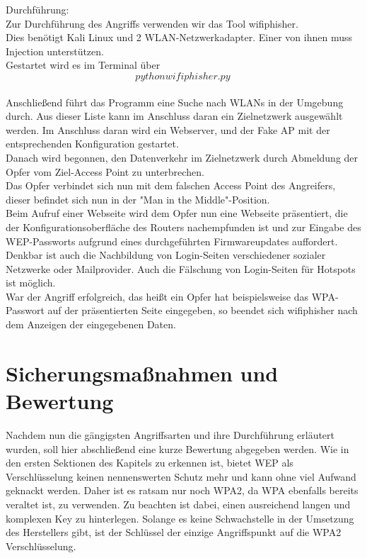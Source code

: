 Durchführung: \\

Zur Durchführung des Angriffs verwenden wir das Tool wifiphisher.\\ 

Dies benötigt Kali Linux und 2 WLAN-Netzwerkadapter. Einer von ihnen muss Injection unterstützen. \\

Gestartet wird es im Terminal über 
$$python wifiphisher.py ~$$\\

Anschließend führt das Programm eine Suche nach WLANs in der Umgebung durch. Aus dieser Liste kann im Anschluss daran ein  Zielnetzwerk ausgewählt werden. Im Anschluss daran wird ein Webserver, und der Fake AP mit der entsprechenden Konfiguration gestartet. \\

Danach wird begonnen, den Datenverkehr im Zielnetzwerk durch Abmeldung der Opfer vom Ziel-Access Point zu unterbrechen. \\

Das Opfer verbindet sich nun mit dem falschen Access Point des Angreifers, dieser befindet sich nun in der "Man in the Middle"-Position. \\

Beim Aufruf einer Webseite wird dem Opfer nun eine Webseite präsentiert, die der Konfigurationsoberfläche des Routers nachempfunden ist und zur Eingabe des WEP-Passworts aufgrund eines durchgeführten Firmwareupdates auffordert. Denkbar ist auch die Nachbildung von Login-Seiten verschiedener sozialer Netzwerke oder Mailprovider. Auch die Fälschung von Login-Seiten für Hotspots ist möglich. \\

War der Angriff erfolgreich, das heißt ein Opfer hat beispielsweise das WPA-Passwort auf der präsentierten Seite eingegeben, so beendet sich wifiphisher nach dem Anzeigen der eingegebenen Daten.

\section{Sicherungsmaßnahmen und Bewertung}

Nachdem nun die gängigsten Angriffsarten und ihre Durchführung erläutert wurden, soll hier abschließend eine kurze Bewertung abgegeben werden. Wie in den ersten Sektionen des Kapitels zu erkennen ist, bietet WEP als Verschlüsselung keinen nennenswerten Schutz mehr und kann ohne viel Aufwand geknackt werden. Daher ist es ratsam nur noch WPA2, da WPA ebenfalls bereits veraltet ist, zu verwenden. Zu beachten ist dabei, einen ausreichend langen und komplexen Key zu hinterlegen. Solange es keine Schwachstelle in der Umsetzung des Herstellers gibt, ist der Schlüssel der einzige Angriffspunkt auf die WPA2 Verschlüsselung. \\

